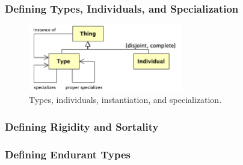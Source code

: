 \documentclass{article}
\newcommand{\BeginEndurantTaxonomyOfPropertiesBegin}{196}
\newcommand{\EndEndurantTaxonomyOfPropertiesEnd}{273}
\newcommand{\BeginInstantationAndSpecialzation}{275}
\newcommand{\EndInstantationAndSpecialzation}{352}
\newcommand{\BeginRigidityAndSortality}{354}
\newcommand{\EndRigidityAndSortality}{599}
\newcommand{\BeginEndurantsTypesDefinition}{601}
\newcommand{\EndEndurantsTypesDefinition}{674}
\begin{document}


\subsubsection{Defining Types, Individuals, and Specialization}

\begin{figure}[ht]
    \centering
    \includegraphics[width=0.6\textwidth]{diagrams/Instantiation_Diagram.png}
    \caption{Types, individuals, instantiation, and specialization.}
    \label{fig:instantiation_and_specialization}
\end{figure}



\subsubsection{Defining Rigidity and Sortality}



\subsubsection{Defining Endurant Types}



% 
% 
\end{document}
